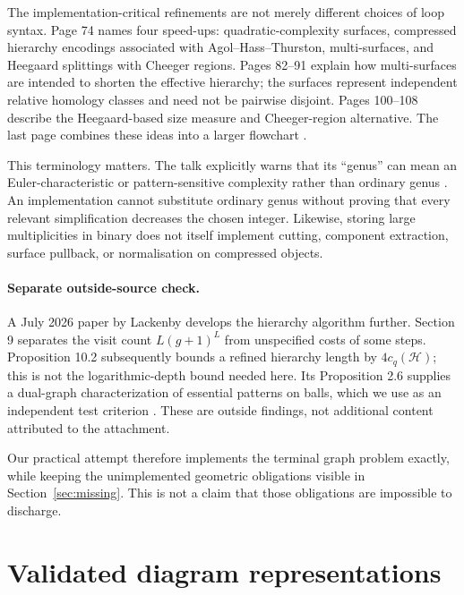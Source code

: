 \documentclass[11pt]{article}
\theoremstyle{remark}\newtheorem{remark}[theorem]{Remark}
\begin{document}
The implementation-critical refinements are not merely different choices of
loop syntax. Page 74 names four speed-ups: quadratic-complexity surfaces,
compressed hierarchy encodings associated with Agol--Hass--Thurston,
multi-surfaces, and Heegaard splittings with Cheeger regions. Pages 82--91
explain how multi-surfaces are intended to shorten the effective hierarchy;
the surfaces represent independent relative homology classes and need not be
pairwise disjoint. Pages 100--108 describe the Heegaard-based size measure and
Cheeger-region alternative. The last page combines these ideas into a larger
flowchart \cite[pp.~74, 82--91, 100--109]{notes}.

This terminology matters. The talk explicitly warns that its ``genus'' can mean
an Euler-characteristic or pattern-sensitive complexity rather than ordinary
genus \cite[p.~59]{notes}. An implementation cannot substitute ordinary genus
without proving that every relevant simplification decreases the chosen
integer. Likewise, storing large multiplicities in binary does not itself
implement cutting, component extraction, surface pullback, or normalisation on
compressed objects.

\paragraph{Separate outside-source check.}
A July 2026 paper by Lackenby develops the hierarchy algorithm further.
Section 9 separates the visit count $L(g+1)^L$ from unspecified costs of some
steps. Proposition 10.2 subsequently bounds a refined hierarchy length by
$4c_q(\mathcal H)$; this is not the logarithmic-depth bound needed here. Its
Proposition 2.6 supplies a dual-graph characterization of essential patterns on
balls, which we use as an independent test criterion \cite{lackenby2026}.
These are outside findings, not additional content attributed to the attachment.

Our practical attempt therefore implements the terminal graph problem exactly,
while keeping the unimplemented geometric obligations visible in
Section~\ref{sec:missing}. This is not a claim that those obligations are
impossible to discharge.

\section{Validated diagram representations}
\end{document}
